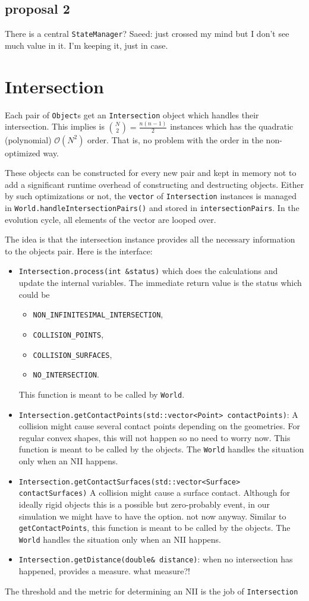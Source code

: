 \documentclass[a4paper]{report}
\newcommand{\cm}[1]{{\color{red}#1}}
\begin{document}
\section{proposal 2}
There is a central \verb+StateManager+? \cm{Saeed: just crossed my mind but I don't see much value in it. I'm keeping it, just in case.}


\chapter{Intersection}
\label{chap:intersection}
Each pair of \verb+Object+s get an \verb+Intersection+ object which handles their intersection.  This implies is $\binom{N}{2}=\frac{n(n-1)}{2}$ instances which has the quadratic (polynomial) $\mathcal{O}(N^2)$ order. That is, no problem with the order in the non-optimized way.

These objects can be constructed for every new pair and kept in memory not to add a significant runtime overhead of constructing and destructing objects. Either by such optimizations or not, the \verb+vector+ of \verb+Intersection+ instances is managed in \verb+World.handleIntersectionPairs()+ and stored in \verb+intersectionPairs+. In the evolution cycle, all elements of the vector are looped over. 

The idea is that the intersection instance provides all the necessary information to the objects pair. Here is the interface:
\begin{itemize}
	\item \verb+Intersection.process(int &status)+ which does the calculations and update the internal variables. The immediate return value is the status which could be 
	\begin{itemize}
		\item \verb+NON_INFINITESIMAL_INTERSECTION+,
		\item \verb+COLLISION_POINTS+, 
		\item \verb+COLLISION_SURFACES+, 
		\item \verb+NO_INTERSECTION+.
	\end{itemize}
	This function is meant to be called by \verb+World+.
	\item \verb+Intersection.getContactPoints(std::vector<Point> contactPoints)+: A collision might cause several contact points depending on the geometries. \cm{For regular convex shapes, this will not happen so no need to worry now.} This function is meant to be called by the objects. The \verb+World+ handles the situation only when an NII happens.
	\item \verb+Intersection.getContactSurfaces(std::vector<Surface> contactSurfaces)+ A collision might cause a surface contact. Although for ideally rigid objects this is a possible but zero-probably event, in our simulation we might have to have the option. \cm{not now anyway.} Similar to \verb+getContactPoints+, this function is meant to be called by the objects. The \verb+World+ handles the situation only when an NII happens.
	\item \verb+Intersection.getDistance(double& distance)+: when no intersection has happened, provides a measure. \cm{what measure?!}
\end{itemize}

The threshold and the metric for determining an NII is the job of \verb+Intersection+




\end{document}
